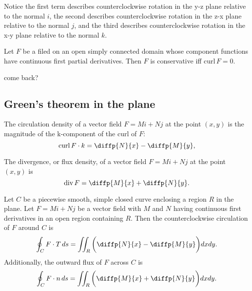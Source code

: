 \documentclass{article}
\begin{document}
\begin{remark}
	Notice the first term describes counterclockwise rotation in the y-z plane relative to the normal \(i\), the second describes counterclockwise rotation in the z-x plane relative to the normal \(j\), and the third describes counterclockwise rotation in the x-y plane relative to the normal \(k\).
\end{remark}
\begin{theorem}
	Let \(F\) be a filed on an open simply connected domain whose component functions have continuous first partial derivatives. Then \(F\) is conservative iff \(\text{curl}\,F=0\).
\end{theorem}
\begin{definition}
	come back?
\end{definition}
\subsection{Green's theorem in the plane}
\begin{definition}
	The circulation density of a vector field \(F=Mi+Nj\) at the point \((x,y)\) is the magnitude of the k-component of the curl of \(F\):
	\begin{equation*}
		\text{curl}\,F\cdot k=\diffp{N}{x}-\diffp{M}{y},
	\end{equation*}
\end{definition}
\begin{definition}[Divergence]
	The divergence, or flux density, of a vector field \(F=Mi+Nj\) at the point \((x,y)\) is
	\begin{equation*}
		\text{div}\,F=\diffp{M}{x}+\diffp{N}{y}.
	\end{equation*}
\end{definition}
\begin{theorem}
	Let \(C\) be a piecewise smooth, simple closed curve enclosing a region \(R\) in the plane. Let \(F=Mi+Nj\) be a vector field with \(M\) and \(N\) having continuous first derivatives in an open region containing \(R\). Then the counterclockwise circulation of \(F\) around \(C\) is
\begin{equation*}
	\oint_{C}F\cdot T\,ds=\iint_R\bigg(\diffp{N}{x}-\diffp{M}{y}\bigg)dxdy.
\end{equation*}
	Additionally, the outward flux of \(F\) across \(C\) is
\begin{equation*}
	\oint_{C}F\cdot n\,ds=\iint_R\bigg(\diffp{M}{x}+\diffp{N}{y}\bigg)dxdy.
\end{equation*}
\end{theorem}
\end{document}
